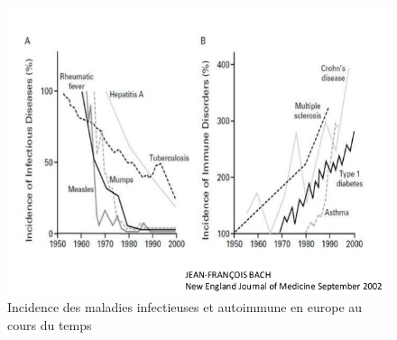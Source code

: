 \documentclass[12pt,a4paper]{article}
\begin{document}
\begin{figure}[ht]
\begin{center}
\includegraphics[scale=0.5]{img/allergie_infection.jpg}\hfill
\end{center}
\caption{Incidence des maladies infectieuses et autoimmune en europe au cours du temps}
\label{hyigienisme}
\end{figure}
\end{document}
